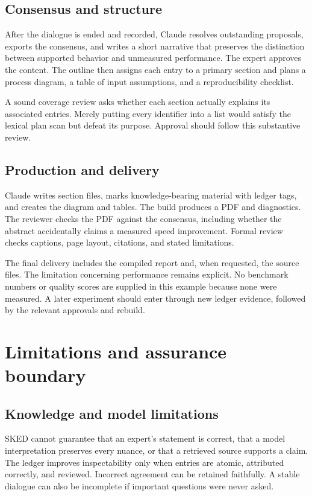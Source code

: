 \documentclass[12pt,a4paper]{article}
\begin{document}
\subsection{Consensus and structure}
After the dialogue is ended and recorded, Claude resolves outstanding proposals, exports the consensus, and writes a short narrative that preserves the distinction between supported behavior and unmeasured performance. The expert approves the content. The outline then assigns each entry to a primary section and plans a process diagram, a table of input assumptions, and a reproducibility checklist.

A sound coverage review asks whether each section actually explains its associated entries. Merely putting every identifier into a list would satisfy the lexical plan scan but defeat its purpose. Approval should follow this substantive review.

\subsection{Production and delivery}
Claude writes section files, marks knowledge-bearing material with ledger tags, and creates the diagram and tables. The build produces a PDF and diagnostics. The reviewer checks the PDF against the consensus, including whether the abstract accidentally claims a measured speed improvement. Formal review checks captions, page layout, citations, and stated limitations.

The final delivery includes the compiled report and, when requested, the source files. The limitation concerning performance remains explicit. No benchmark numbers or quality scores are supplied in this example because none were measured. A later experiment should enter through new ledger evidence, followed by the relevant approvals and rebuild.

\section{Limitations and assurance boundary}
\subsection{Knowledge and model limitations}
SKED cannot guarantee that an expert's statement is correct, that a model interpretation preserves every nuance, or that a retrieved source supports a claim. The ledger improves inspectability only when entries are atomic, attributed correctly, and reviewed. Incorrect agreement can be retained faithfully. A stable dialogue can also be incomplete if important questions were never asked.
\end{document}
